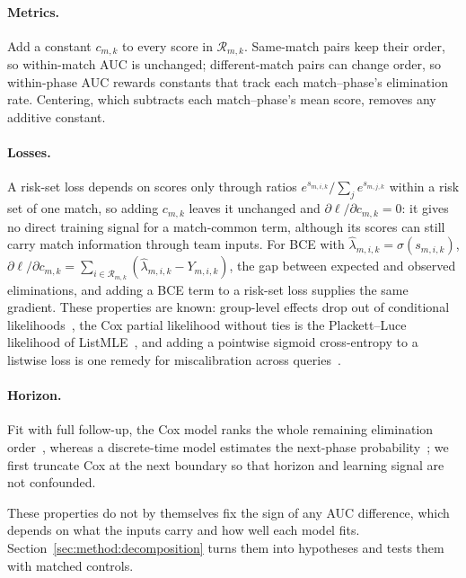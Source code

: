 \documentclass[sigconf,anonymous]{acmart}
\begin{document}
\paragraph{Metrics.}
Add a constant $c_{m,k}$ to every score in $\mathcal{R}_{m,k}$. Same-match pairs keep their order, so within-match AUC is unchanged; different-match pairs can change order, so within-phase AUC rewards constants that track each match--phase's elimination rate. Centering, which subtracts each match--phase's mean score, removes any additive constant.

\paragraph{Losses.}
A risk-set loss depends on scores only through ratios $e^{s_{m,i,k}}/\sum_{j}e^{s_{m,j,k}}$ within a risk set of one match, so adding $c_{m,k}$ leaves it unchanged and $\partial\ell/\partial c_{m,k}=0$: it gives no direct training signal for a match-common term, although its scores can still carry match information through team inputs. For BCE with $\hat\lambda_{m,i,k}=\sigma(s_{m,i,k})$, $\partial\ell/\partial c_{m,k}=\sum_{i\in\mathcal{R}_{m,k}}(\hat\lambda_{m,i,k}-Y_{m,i,k})$, the gap between expected and observed eliminations, and adding a BCE term to a risk-set loss supplies the same gradient. These properties are known: group-level effects drop out of conditional likelihoods~\cite{Chamberlain80}, the Cox partial likelihood without ties is the Plackett--Luce likelihood of ListMLE~\cite{Xia08}, and adding a pointwise sigmoid cross-entropy to a listwise loss is one remedy for miscalibration across queries~\cite{Bai23}.

\paragraph{Horizon.}
Fit with full follow-up, the Cox model ranks the whole remaining elimination order~\cite{Cox72}, whereas a discrete-time model estimates the next-phase probability~\cite{SingerWillett93,Gensheimer19}; we first truncate Cox at the next boundary so that horizon and learning signal are not confounded.


These properties do not by themselves fix the sign of any AUC difference, which depends on what the inputs carry and how well each model fits. Section~\ref{sec:method:decomposition} turns them into hypotheses and tests them with matched controls.

\end{document}
